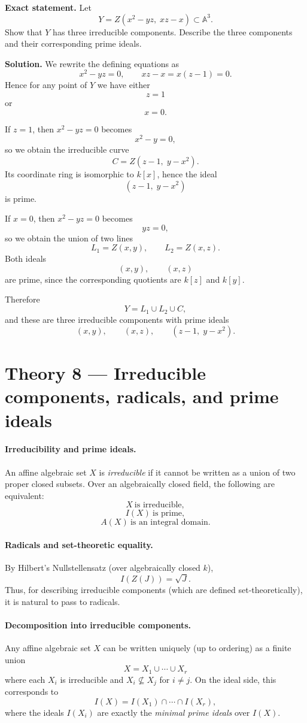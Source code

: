 \documentclass[12pt,a4paper]{article}
\theoremstyle{plain}
\theoremstyle{definition}      %
\begin{document}
\textbf{Exact statement.}
Let
\[
Y
=
Z(x^2-yz,\;xz-x)
\subset
\mathbb A^3.
\]
Show that $Y$ has three irreducible components.
Describe the three components and their corresponding prime ideals.

\textbf{Solution.}
We rewrite the defining equations as
\[
x^2-yz
=
0,
\qquad
xz-x
=
x(z-1)
=
0.
\]
Hence for any point of $Y$ we have either
\[
z=1
\]
or
\[
x=0.
\]

If $z=1$, then $x^2-yz=0$ becomes
\[
x^2-y=0,
\]
so we obtain the irreducible curve
\[
C
=
Z(z-1,\;y-x^2).
\]
Its coordinate ring is isomorphic to $k[x]$, hence the ideal
\[
(z-1,\;y-x^2)
\]
is prime.

If $x=0$, then $x^2-yz=0$ becomes
\[
yz=0,
\]
so we obtain the union of two lines
\[
L_1
=
Z(x,y),
\qquad
L_2
=
Z(x,z).
\]
Both ideals
\[
(x,y),
\qquad
(x,z)
\]
are prime, since the corresponding quotients are $k[z]$ and $k[y]$.

Therefore
\[
Y
=
L_1\cup L_2\cup C,
\]
and these are three irreducible components with prime ideals
\[
(x,y),
\qquad
(x,z),
\qquad
(z-1,\;y-x^2).
\]

\section*{Theory 8 — Irreducible components, radicals, and prime ideals}

\paragraph{Irreducibility and prime ideals.}
An affine algebraic set $X$ is \emph{irreducible} if it cannot be written as a union of two proper closed subsets.
Over an algebraically closed field, the following are equivalent:
\[
X \ \text{is irreducible},
\]
\[
I(X)\ \text{is prime},
\]
\[
A(X)\ \text{is an integral domain}.
\]

\paragraph{Radicals and set-theoretic equality.}
By Hilbert's Nullstellensatz (over algebraically closed $k$),
\[
I(Z(J))=\sqrt{J}.
\]
Thus, for describing irreducible components (which are defined set-theoretically), it is natural to pass to radicals.

\paragraph{Decomposition into irreducible components.}
Any affine algebraic set $X$ can be written uniquely (up to ordering) as a finite union
\[
X = X_1 \cup \cdots \cup X_r
\]
where each $X_i$ is irreducible and $X_i \nsubseteq X_j$ for $i\neq j$.
On the ideal side, this corresponds to
\[
I(X)
=
I(X_1)\cap \cdots \cap I(X_r),
\]
where the ideals $I(X_i)$ are exactly the \emph{minimal prime ideals} over $I(X)$.
\end{document}
